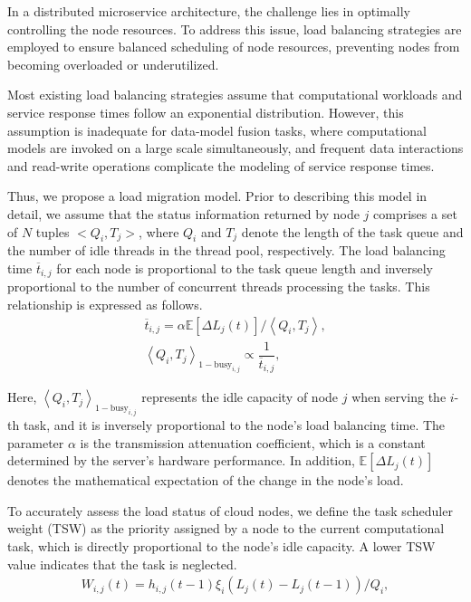 \documentclass[twoside,twocolumn]{article}
\begin{document}
In a distributed microservice architecture, the challenge lies in optimally controlling the node resources. To address this issue, load balancing strategies are employed to ensure balanced scheduling of node resources, preventing nodes from becoming overloaded or underutilized.

Most existing load balancing strategies assume that computational workloads and service response times follow an exponential distribution. However, this assumption is inadequate for data-model fusion tasks, where computational models are invoked on a large scale simultaneously, and frequent data interactions and read-write operations complicate the modeling of service response times.

Thus, we propose a load migration model. Prior to describing this model in detail, we assume that the status information returned by node $j$ comprises a set of $N$ tuples $<Q_i, T_j>$, where $Q_i$ and $T_j$ denote the length of the task queue and the number of idle threads in the thread pool, respectively. The load balancing time $\overline{t}_{i,j}$ for each node is proportional to the task queue length and inversely proportional to the number of concurrent threads processing the tasks. This relationship is expressed as follows.
\begin{gather}
\overline{t}_{i,j} = \alpha \mathbb{E}\left[\Delta L_j(t)\right] \Big/ \left<Q_i, T_j\right>, \\
\left<Q_i, T_j\right>_{1-\text{busy}_{i,j}} \propto \dfrac{1}{\overline{t}_{i,j}},
\end{gather}

Here, $\left<Q_i, T_j\right>_{1-\text{busy}_{i,j}}$ represents the idle capacity of node $j$ when serving the $i$-th task, and it is inversely proportional to the node's load balancing time. The parameter $\alpha$ is the transmission attenuation coefficient, which is a constant determined by the server's hardware performance. In addition, $\mathbb{E}[\Delta L_j(t)]$ denotes the mathematical expectation of the change in the node's load.

To accurately assess the load status of cloud nodes, we define the task scheduler weight (TSW) as the priority assigned by a node to the current computational task, which is directly proportional to the node's idle capacity. A lower TSW value indicates that the task is neglected.
\begin{align}
W_{i,j}(t) = h_{i,j}(t-1)\xi_i\left(L_j(t)-L_j(t-1)\right)\Big/Q_i,
\end{align}
\end{document}
